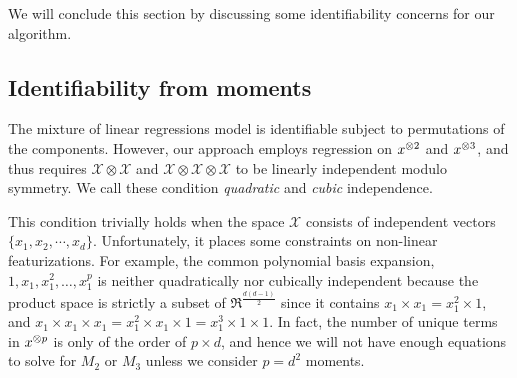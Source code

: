 We will conclude this section by
discussing some identifiability concerns for our algorithm.


\subsection{Identifiability from moments}

The mixture of linear regressions model is identifiable subject to
permutations of the components\citationneeded. However, our approach
employs regression on $x^{\otimes 2}$ and $x^{\otimes 3}$, and thus requires
$\mathcal{X} \otimes \mathcal{X}$ and $\mathcal{X} \otimes \mathcal{X}
\otimes \mathcal{X}$ to be linearly independent modulo symmetry. We call
these condition {\em quadratic} and {\em cubic} independence.

This condition trivially holds when the space $\mathcal{X}$ consists of
independent vectors $\{ x_1, x_2, \cdots, x_d \}$. Unfortunately, it
places some constraints on non-linear featurizations. For example, the
common polynomial basis expansion, $1, x_1, x_1^2, \dots, x_1^p$ is
neither quadratically nor cubically independent because the product
space is strictly a subset of $\Re^{\frac{d (d-1)}{2}}$ since it
contains $x_1 \times x_1 = x_1^2 \times 1$, and $x_1 \times x_1 \times
x_1 = x_1^2 \times x_1 \times 1 = x_1^3 \times 1 \times 1$. In fact, the
number of unique terms in $x^{\otimes p}$ is only of the order of $p \times
d$, and hence we will not have enough equations to solve for $M_2$ or
$M_3$ unless we consider $p = d^2$ moments.




